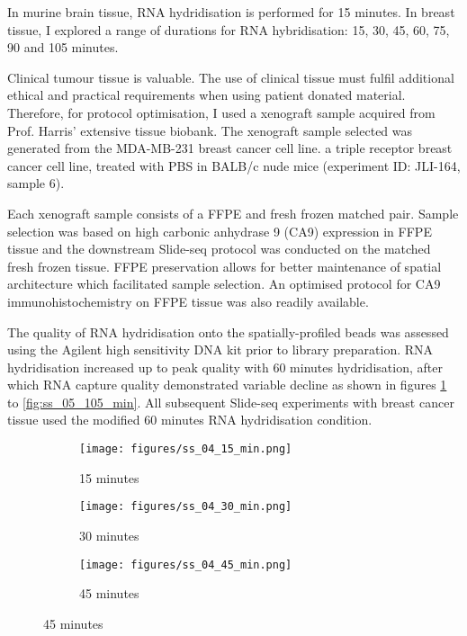 In murine brain tissue, RNA hydridisation is performed for 15 minutes. In breast tissue, I explored a range of durations for RNA hybridisation: 15, 30, 45, 60, 75, 90 and 105 minutes.

Clinical tumour tissue is valuable. The use of clinical tissue must fulfil additional ethical and practical requirements when using patient donated material. Therefore, for protocol optimisation, I used a xenograft sample acquired from Prof. Harris' extensive tissue biobank. The xenograft sample selected was generated from the MDA-MB-231 breast cancer cell line. a triple receptor breast cancer cell line, treated with PBS in BALB/c nude mice (experiment ID: JLI-164, sample 6).

Each xenograft sample consists of a FFPE and fresh frozen matched pair. Sample selection was based on high carbonic anhydrase 9 (CA9) expression in FFPE tissue and the downstream Slide-seq protocol was conducted on the matched fresh frozen tissue. FFPE preservation allows for better maintenance of spatial architecture which facilitated sample selection. An optimised protocol for CA9 immunohistochemistry on FFPE tissue was also readily available.

The quality of RNA hydridisation onto the spatially-profiled beads was assessed using the Agilent high sensitivity DNA kit prior to library preparation. RNA hydridisation increased up to peak quality with 60 minutes hydridisation, after which RNA capture quality demonstrated variable decline as shown in figures \ref{fig:ss_04_15_min} to \ref{fig:ss_05_105_min}. All subsequent Slide-seq experiments with breast cancer tissue used the modified 60 minutes RNA hydridisation condition.

\begin{figure}[ht]
	\begin{subfigure}
		\centering
		\texttt{[image: figures/ss\_04\_15\_min.png]}  
		\caption[Slide-seq optimisation: 15 minutes]{15 minutes}
		\label{fig:ss_04_15_min}
	\end{subfigure}
	\begin{subfigure}
		\centering
		\texttt{[image: figures/ss\_04\_30\_min.png]}  
		\caption{30 minutes}
		\label{fig:ss_04_30_min}
	\end{subfigure}
	\begin{subfigure}
		\centering
		\texttt{[image: figures/ss\_04\_45\_min.png]}  
		\caption{45 minutes}
		\label{fig:ss_04_45_min}
	\end{subfigure}
\end{figure}

